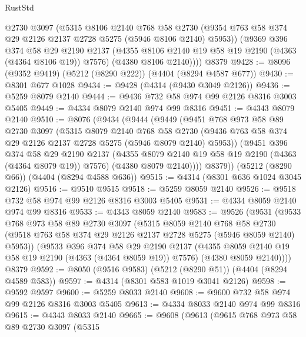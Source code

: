 \begin{lexlean}{RustStd}
\begin{coremodule}
        @2730
        @3097
        (@5315
          @8106
          @2140
          @768
          @58
          @2730
          (@9354 @763 @58 @374 @29 @2126 @2137 @2728 @5275 (@5946 @8106 @2140) @5953))
        (@9369
          @396
          @374
          @58
          @29
          @2190
          @2137
          (@4355 @8106 @2140 @19 @58 @19 @2190 (@4363 (@4364 @8106 @19)) @7576)
          (@4380 @8106 @2140))))
    @8379
@9428 := @8096 (@9352 @9419) (@5212 (@8290 @222)) (@4404 (@8294 @4587 @677))
@9430 := @8301 @677 @1028
@9434 := @9428 (@4314 (@9430 @3049 @2126))
@9436 := @5259 @8079 @2140
@9444 := @9436 @732 @58 @974 @99 @2126 @8316 @3003 @5405
@9449 := @4334 @8079 @2140 @974 @99 @8316
@9451 := @4343 @8079 @2140
@9510 := @8076
    (@9434
      (@9444
        (@9449
          (@9451
            @768
            @973
            @58
            @89
            @2730
            @3097
            (@5315
              @8079
              @2140
              @768
              @58
              @2730
              (@9436 @763 @58 @374 @29 @2126 @2137 @2728 @5275 (@5946 @8079 @2140) @5953))
            (@9451
              @396
              @374
              @58
              @29
              @2190
              @2137
              (@4355 @8079 @2140 @19 @58 @19 @2190 (@4363 (@4364 @8079 @19)) @7576)
              (@4380 @8079 @2140))))
        @8379))
    (@5212 (@8290 @66))
    (@4404 (@8294 @4588 @636))
@9515 := @4314 (@8301 @636 @1024 @3045 @2126)
@9516 := @9510 @9515
@9518 := @5259 @8059 @2140
@9526 := @9518 @732 @58 @974 @99 @2126 @8316 @3003 @5405
@9531 := @4334 @8059 @2140 @974 @99 @8316
@9533 := @4343 @8059 @2140
@9583 := @9526
    (@9531
      (@9533
        @768
        @973
        @58
        @89
        @2730
        @3097
        (@5315
          @8059
          @2140
          @768
          @58
          @2730
          (@9518 @763 @58 @374 @29 @2126 @2137 @2728 @5275 (@5946 @8059 @2140) @5953))
        (@9533
          @396
          @374
          @58
          @29
          @2190
          @2137
          (@4355 @8059 @2140 @19 @58 @19 @2190 (@4363 (@4364 @8059 @19)) @7576)
          (@4380 @8059 @2140))))
    @8379
@9592 := @8050 (@9516 @9583) (@5212 (@8290 @51)) (@4404 (@8294 @4589 @583))
@9597 := @4314 (@8301 @583 @1019 @3041 @2126)
@9598 := @9592 @9597
@9600 := @5259 @8033 @2140
@9608 := @9600 @732 @58 @974 @99 @2126 @8316 @3003 @5405
@9613 := @4334 @8033 @2140 @974 @99 @8316
@9615 := @4343 @8033 @2140
@9665 := @9608
    (@9613
      (@9615
        @768
        @973
        @58
        @89
        @2730
        @3097
        (@5315

\end{coremodule}
\end{lexlean}
